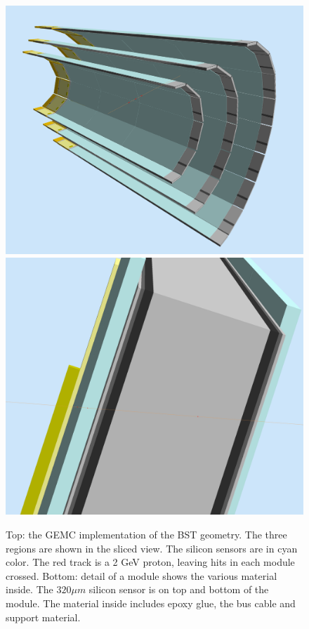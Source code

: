 \begin{figure}
	\centering
	\includegraphics[width=0.95\columnwidth,keepaspectratio]{img/bstGeometry.png}
	\includegraphics[width=0.95\columnwidth,keepaspectratio]{img/bstDetail.png}
	\caption{Top: the GEMC implementation of the BST geometry. The three regions are shown in the sliced view. The silicon sensors are
           in cyan color. The red track is a 2 GeV proton, leaving hits in each module crossed. Bottom: detail of a module shows
           the various material inside. The $320 \mu m$ silicon sensor is on top and bottom of the module.
           The material inside includes epoxy glue, the bus cable and support material. }
	\label{fig:bstGeometry}
\end{figure}


